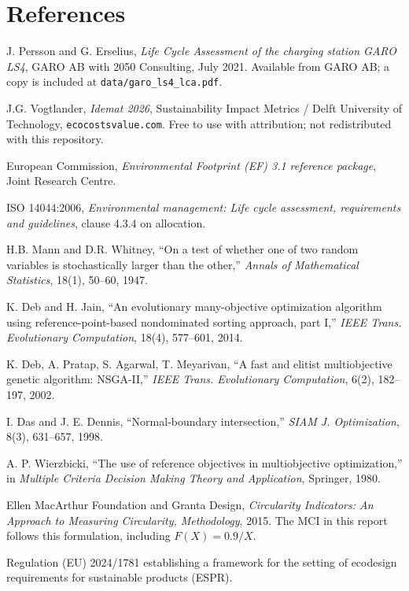 \documentclass[11pt,a4paper]{article}
\begin{document}
\section*{References}
\small
\begin{enumerate}[label={[\arabic*]}]
\item J. Persson and G. Erselius, \emph{Life Cycle Assessment of the charging
station GARO LS4}, GARO AB with 2050 Consulting, July 2021. Available from
GARO AB; a copy is included at \texttt{data/garo\_ls4\_lca.pdf}.
\item J.G. Vogtlander, \emph{Idemat 2026}, Sustainability Impact Metrics /
Delft University of Technology, \texttt{ecocostsvalue.com}. Free to use with
attribution; not redistributed with this repository.
\item European Commission, \emph{Environmental Footprint (EF) 3.1 reference
package}, Joint Research Centre.
\item ISO 14044:2006, \emph{Environmental management: Life cycle assessment,
requirements and guidelines}, clause 4.3.4 on allocation.
\item H.B. Mann and D.R. Whitney, ``On a test of whether one of two random
variables is stochastically larger than the other,'' \emph{Annals of
Mathematical Statistics}, 18(1), 50--60, 1947.
\item K. Deb and H. Jain, ``An evolutionary many-objective optimization
algorithm using reference-point-based nondominated sorting approach, part I,''
\emph{IEEE Trans. Evolutionary Computation}, 18(4), 577--601, 2014.
\item K. Deb, A. Pratap, S. Agarwal, T. Meyarivan, ``A fast and elitist
multiobjective genetic algorithm: NSGA-II,'' \emph{IEEE Trans. Evolutionary
Computation}, 6(2), 182--197, 2002.
\item I. Das and J. E. Dennis, ``Normal-boundary intersection,''
\emph{SIAM J. Optimization}, 8(3), 631--657, 1998.
\item A. P. Wierzbicki, ``The use of reference objectives in multiobjective
optimization,'' in \emph{Multiple Criteria Decision Making Theory and
Application}, Springer, 1980.
\item Ellen MacArthur Foundation and Granta Design, \emph{Circularity
Indicators: An Approach to Measuring Circularity, Methodology}, 2015. The
MCI in this report follows this formulation, including $F(X)=0.9/X$.
\item Regulation (EU) 2024/1781 establishing a framework for the setting of
ecodesign requirements for sustainable products (ESPR).

\end{enumerate}
\end{document}
